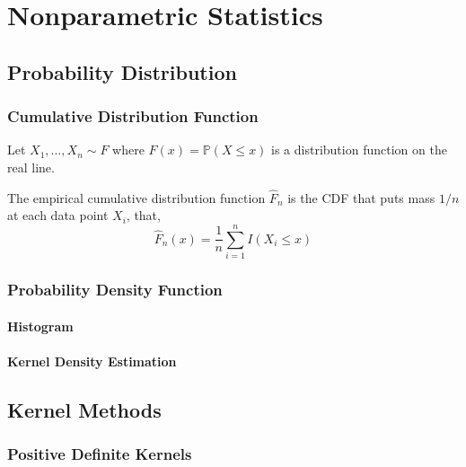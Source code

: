 \chapter{Nonparametric Statistics}

\section{Probability Distribution}

\subsection{Cumulative Distribution Function}

Let $X_{1},\ldots,X_{n}\sim F$ where $F(x)=\mathbb{P}(X\leq x)$ is a distribution function on the real line.

\begin{definition}
	The empirical cumulative distribution function $\widehat{F}_{n}$ is the CDF that puts mass $1/n$ at each data point $X_{i}$, that,
	\begin{equation}
		\widehat{F}_{n}(x)=\frac{1}{n}\sum_{i=1}^{n}I\left(X_{i}\leq x\right)
	\end{equation}
\end{definition}

\subsection{Probability Density Function}

\subsubsection{Histogram}

\subsubsection{Kernel Density Estimation}

\section{Kernel Methods}

\subsection{Positive Definite Kernels}

